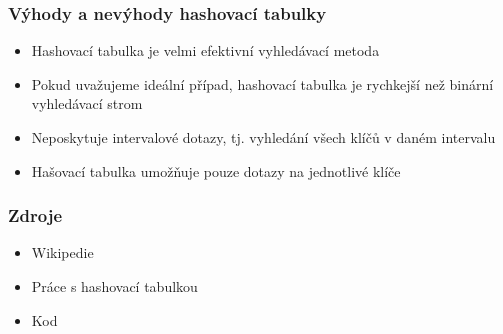\documentclass{beamer}
\begin{document}
    \begin{frame}
        \frametitle{Výhody a nevýhody hashovací tabulky}
        \begin{itemize}
            \item Hashovací tabulka je velmi efektivní vyhledávací metoda
            \item Pokud uvažujeme ideální případ, hashovací tabulka je rychkejší než binární vyhledávací strom
            \item Neposkytuje intervalové dotazy, tj. vyhledání všech klíčů v daném intervalu
            \item Hašovací tabulka umožňuje pouze dotazy na jednotlivé klíče
        \end{itemize}
    \end{frame}
    
    \begin{frame}
        \frametitle{Zdroje}
        \begin{itemize}
            \item Wikipedie \href{https://cz.wikipedia.org/wiki/Hash_table}{}
            \item Práce s hashovací tabulkou \href{https://www.itnetwork.cz/navrh/algoritmy/algoritmy-vyhledavani/algoritmus-vyhledavani-hashovaci-tabulka}{}
            \item Kod \href{https://www.journaldev.com/35238/hash-table-in-c-plus-plus}{}
        \end{itemize}
    \end{frame}
    
\end{document}
